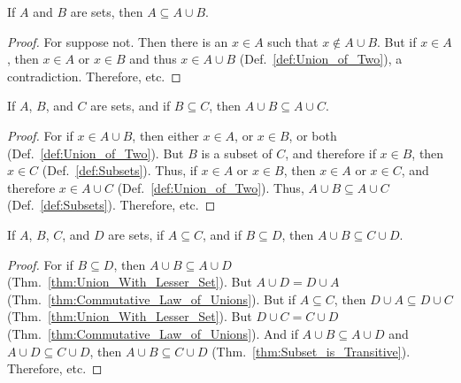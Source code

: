             \begin{theorem}
                \label{thm:Union_is_Bigger}%
                If $A$ and $B$ are sets, then
                $A\subseteq{A}\cup{B}$.
            \end{theorem}
            \begin{proof}
                For suppose not. Then there is an $x\in{A}$ such
                that $x\notin{A}\cup{B}$. But if $x\in{A}$, then
                $x\in{A}$ or $x\in{B}$ and thus $x\in{A}\cup{B}$
                (Def.~\ref{def:Union_of_Two}), a
                contradiction. Therefore, etc.
            \end{proof}
            \begin{theorem}
                \label{thm:Union_With_Lesser_Set}%
                If $A$, $B$, and $C$ are sets, and if
                $B\subseteq{C}$, then
                $A\cup{B}\subseteq{A}\cup{C}$.
            \end{theorem}
            \begin{proof}
                For if $x\in{A}\cup{B}$, then either $x\in{A}$,
                or $x\in{B}$, or both
                (Def.~\ref{def:Union_of_Two}). But $B$ is a
                subset of $C$, and therefore if $x\in{B}$, then
                $x\in{C}$ (Def.~\ref{def:Subsets}).
                Thus, if $x\in{A}$ or $x\in{B}$, then
                $x\in{A}$ or $x\in{C}$, and therefore
                $x\in{A}\cup{C}$ (Def.~\ref{def:Union_of_Two}).
                Thus, $A\cup{B}\subseteq{A}\cup{C}$
                (Def.~\ref{def:Subsets}). Therefore, etc.
            \end{proof}
            \begin{theorem}
                If $A$, $B$, $C$, and $D$ are sets, if
                $A\subseteq{C}$, and if $B\subseteq{D}$, then
                $A\cup{B}\subseteq{C}\cup{D}$.
            \end{theorem}
            \begin{proof}
                For if $B\subseteq{D}$, then
                $A\cup{B}\subseteq{A}\cup{D}$
                (Thm.~\ref{thm:Union_With_Lesser_Set}).
                But $A\cup{D}=D\cup{A}$
                (Thm.~\ref{thm:Commutative_Law_of_Unions}).
                But if $A\subseteq{C}$, then
                $D\cup{A}\subseteq{D}\cup{C}$
                (Thm.~\ref{thm:Union_With_Lesser_Set}). But
                $D\cup{C}=C\cup{D}$
                (Thm.~\ref{thm:Commutative_Law_of_Unions}).
                And if $A\cup{B}\subseteq{A}\cup{D}$ and
                $A\cup{D}\subseteq{C}\cup{D}$, then
                $A\cup{B}\subseteq{C}\cup{D}$
                (Thm.~\ref{thm:Subset_is_Transitive}).
                Therefore, etc.
            \end{proof}
